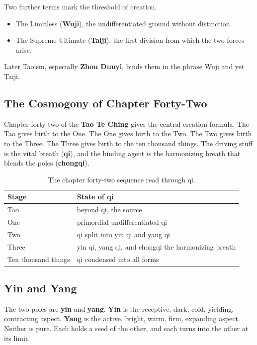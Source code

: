 Two further terms mark the threshold of creation.

\begin{itemize}
 \item The Limitless (\textbf{Wuji}), the undifferentiated ground without distinction.
 \item The Supreme Ultimate (\textbf{Taiji}), the first division from which the two forces arise.
\end{itemize}

Later Taoism, especially \textbf{Zhou Dunyi}, binds them in the phrase Wuji and yet Taiji.

\subsection{The Cosmogony of Chapter Forty-Two}

Chapter forty-two of the \textbf{Tao Te Ching} gives the central creation formula. The Tao gives birth to the One. The One gives birth to the Two. The Two gives birth to the Three. The Three gives birth to the ten thousand things. The driving stuff is the vital breath (\textbf{qi}), and the binding agent is the harmonizing breath that blends the poles (\textbf{chongqi}).

\begin{longtable}{l L{8cm} }
\caption{The chapter forty-two sequence read through qi.}\\
\toprule
\textbf{Stage} & \textbf{State of qi} \\
\midrule
Tao & beyond qi, the source \\
One & primordial undifferentiated qi \\
Two & qi split into yin qi and yang qi \\
Three & yin qi, yang qi, and chongqi the harmonizing breath \\
Ten thousand things & qi condensed into all forms \\
\bottomrule
\end{longtable}

\subsection{Yin and Yang}

The two poles are \textbf{yin} and \textbf{yang}. \textbf{Yin} is the receptive, dark, cold, yielding, contracting aspect. \textbf{Yang} is the active, bright, warm, firm, expanding aspect. Neither is pure. Each holds a seed of the other, and each turns into the other at its limit.

